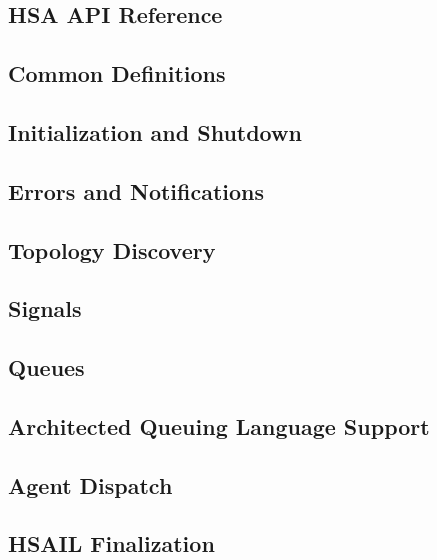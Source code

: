 \documentclass[draft]{book}
\begin{document}
\begin{appendices}

\chapter{HSA API Reference}

\section{Common Definitions}


\section{Initialization and Shutdown}


\section{Errors and Notifications}


\section{Topology Discovery}



\section{Signals}


\section{Queues}


\section{Architected Queuing Language Support}


\section{Agent Dispatch}


\section{HSAIL Finalization}



\end{appendices}
\end{document}
